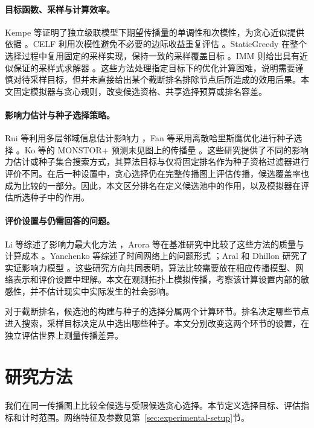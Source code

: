 \documentclass[smallextended]{svjour3}
\begin{document}
\paragraph{目标函数、采样与计算效率。}Kempe 等证明了独立级联模型下期望传播量的单调性和次模性，为贪心近似提供依据 \cite{ref1}。CELF 利用次模性避免不必要的边际收益重复评估 \cite{ref7}。StaticGreedy 在整个选择过程中复用固定的采样实现，保持一致的采样覆盖目标 \cite{ref8}。IMM 则给出具有近似保证的采样式求解器 \cite{ref2}。这些方法处理指定目标下的优化计算困难，说明需要谨慎对待采样目标，但并未直接给出某个截断排名排除节点后所造成的效用后果。本文固定模拟器与贪心规则，改变候选资格、共享选择预算或排名容差。

\paragraph{影响力估计与种子选择策略。}Rui 等利用多层邻域信息估计影响力 \cite{ref12}，Fan 等采用离散哈里斯鹰优化进行种子选择 \cite{ref13}。Ko 等的 MONSTOR+ 预测未见图上的传播量 \cite{ref19}。这些研究提供了不同的影响力估计或种子集合搜索方式，其算法目标与仅将固定排名作为种子资格过滤器进行评价不同。在后一种设置中，贪心选择仍在完整传播图上评估传播，候选覆盖率也成为比较的一部分。因此，本文区分排名在定义候选池中的作用，以及模拟器在评估所选种子中的作用。

\paragraph{评价设置与仍需回答的问题。}Li 等综述了影响力最大化方法 \cite{ref9}，Arora 等在基准研究中比较了这些方法的质量与计算成本 \cite{ref16}。Yanchenko 等综述了时间网络上的问题形式 \cite{ref11}；Aral 和 Dhillon 研究了实证影响力模型 \cite{ref15}。这些研究方向共同表明，算法比较需要放在相应传播模型、网络表示和评价设置中理解。本文在观测拓扑上模拟传播，考察该计算设置内部的敏感性，并不估计现实中实际发生的社会影响。

对于截断排名，候选池的构建与种子的选择分属两个计算环节。排名决定哪些节点进入搜索，采样目标决定从中选出哪些种子。本文分别改变这两个环节的设置，在独立评估世界上测量传播差异。

\section{研究方法}
我们在同一传播图上比较全候选与受限候选贪心选择。本节定义选择目标、评估指标和计时范围。网络特征及参数见第~\ref{sec:experimental-setup}节。
\end{document}
